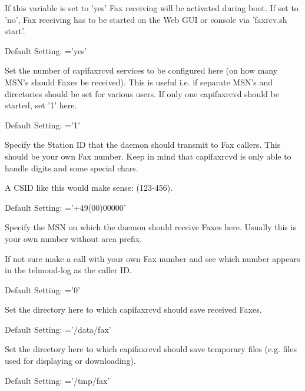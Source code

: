 \begin{description}

    {If this variable is set to 'yes' Fax receiving will be activated during boot. If set to
    'no', Fax receiving has to be started on the Web GUI or console via 'faxrcv.sh start'.

        Default Setting: ='yes'}


    {Set the number of capifaxrcvd services to be configured here (on how many MSN's
    should Faxes be received). This is useful i.e. if separate MSN's and directories
    should be set for various users. If only one capifaxrcvd should be started, set
    '1' here.

        Default Setting: ='1'}


    {Specify the Station ID that the daemon should transmit to
    Fax callers. This should be your own Fax number. Keep in mind that
    capifaxrcvd is only able to handle digits and some special chars.

    A CSID like this would make sense: (123-456). 

        Default Setting: ='+49(00)00000'}



    {Specify the MSN on which the daemon should receive Faxes here.
    Usually this is your own number without area prefix.

     If not sure
    make a call with your own Fax number and see which number appears in the
    telmond-log as the caller ID.

        Default Setting: ='0'}


    {Set the directory here to which capifaxrcvd should save received Faxes.

        Default Setting:
            ='/data/fax'}


    {Set the directory here to which capifaxrcvd should save temporary files
	    (e.g. files used for displaying or downloading).

        Default Setting:
            ='/tmp/fax'}

\end {description}

